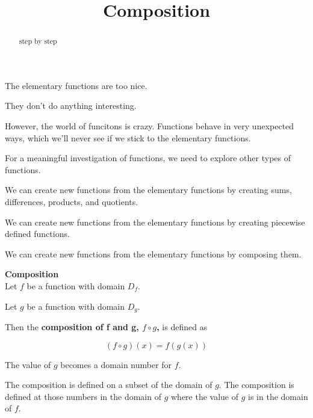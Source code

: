 \documentclass{ximera}
\title{Composition}
\begin{document}
\begin{abstract}
step by step
\end{abstract}
\maketitle



The elementary functions are too nice.

They don't do anything interesting.

However, the world of funcitons is crazy.  Functions behave in very unexpected ways, which we'll never see if we stick to the elementary functions.

For a meaningful investigation of functions, we need to explore other types of functions.

We can create new functions from the elementary functions by creating sums, differences, products, and quotients.


We can create new functions from the elementary functions by creating piecewise defined functions.


We can create new functions from the elementary functions by composing them. 




\begin{template} \textbf{\textcolor{blue!55!black}{Composition}}  \\


Let $f$ be a function with domain $D_f$.


Let $g$ be a function with domain $D_g$.




Then the \textbf{\textcolor{green!50!black}{composition of f and g, $f \circ g$,}} is defined as

\[
(f \circ g)(x) = f(g(x))
\] 


The value of $g$ becomes a domain number for $f$.


The composition is defined on a subset of the domain of $g$.  The composition is defined at those numbers in the domain of $g$ where the value of $g$ is in the domain of $f$.




\end{template}
\end{document}
